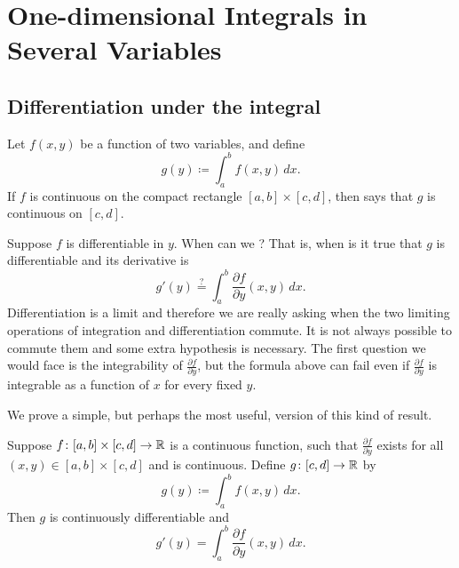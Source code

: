 \chapter{One-dimensional Integrals in Several Variables} \label{path:chapter}


\section{Differentiation under the integral}
\label{sec:diffunderint}


Let $f(x,y)$ be a function of two variables, and define
\begin{equation*}
g(y) \coloneqq \int_a^b f(x,y) \,dx .
\end{equation*}
If $f$ is continuous on the compact rectangle $[a,b] \times [c,d]$, then
says that $g$ is continuous on $[c,d]$.

Suppose $f$ is differentiable in $y$.  
When can we ?
That is, when is it true that $g$ is differentiable and its derivative is
\begin{equation*}
g'(y) \overset{?}{=} \int_a^b \frac{\partial f}{\partial y}(x,y) \,dx .
\end{equation*}
Differentiation is a limit and therefore we are really asking when the
two limiting operations of integration and differentiation commute.
It is not always possible to commute them and some extra hypothesis is
necessary.  The first
question we would face is the integrability of
$\frac{\partial f}{\partial y}$, but the formula above can fail even if
$\frac{\partial f}{\partial y}$ is integrable as a function of $x$ for every
fixed $y$.

We prove a simple, but perhaps the most useful, version of this kind of result.

\begin{thm}
Suppose $f \colon [a,b] \times [c,d] \to {\mathbb{R}}$ is a continuous function,
such that $\frac{\partial f}{\partial y}$ exists for all $(x,y) \in [a,b]
\times [c,d]$ and is continuous.  Define $g \colon [c,d] \to {\mathbb{R}}$ by
\begin{equation*}
g(y) \coloneqq \int_a^b f(x,y) \,dx .
\end{equation*}
Then $g$ is continuously differentiable and
\begin{equation*}
g'(y) = \int_a^b \frac{\partial f}{\partial y}(x,y) \,dx .
\end{equation*}
\end{thm}

